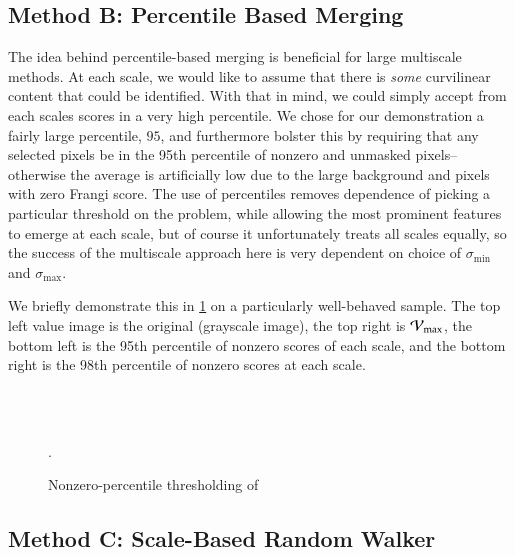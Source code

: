 \subsection{Method B: Percentile Based Merging}

The idea behind percentile-based merging is beneficial for large multiscale methods. At each scale, we would like to assume that there is \textit{some} curvilinear content that could be identified. With that in mind, we could simply accept from each scales scores in a very high percentile. We chose for our demonstration a fairly large percentile, $95$, and furthermore bolster this by requiring that any selected pixels be in the 95th percentile of nonzero and unmasked pixels--otherwise the average is artificially low due to the large background and pixels with zero Frangi score. The use of percentiles removes dependence of picking a particular threshold on the problem, while allowing the most prominent features to emerge at each scale, but of course it unfortunately treats all scales equally, so the success of the multiscale approach here is very dependent on choice of $\sigma_{\min}$ and $\sigma_{\max}$.

	We briefly demonstrate this in \cref{fig:qthresh_demo} on a particularly well-behaved sample. The top left value image is the original (grayscale image), the top right is $\mathcal{V}_{\max}$, the bottom left is the 95th percentile of nonzero scores of each scale, and the bottom right is the 98th percentile of nonzero scores at each scale.

\begin{figure} \centering
   \;
   \\
   \;
   \\
  \caption{Nonzero-percentile thresholding of \Vmax}.
  \label{fig:qthresh_demo}
\end{figure}

\subsection{Method C: Scale-Based Random Walker}

